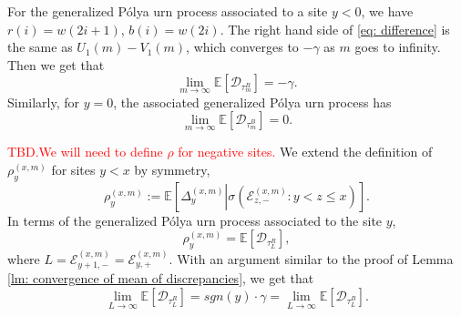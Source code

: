 \documentclass[twoside,12pt,a4paper]{article}
\numberwithin{equation}{section}
\newcommand\TBD{\textcolor{red}{TBD.}}
\begin{document}
		For the generalized P\'{o}lya urn process associated to a site $y<0$, we have $r(i) = w(2i+1)$, $b(i) =w(2i)$. The right hand side of \eqref{eq: difference} is the same as $U_1(m)-V_1(m)$, which converges to $-\gamma$ as $m$ goes to infinity. Then we get that  $$\lim_{m\to\infty}\mathbb{E}\left[ \mathcal{D}_{\tau^B_m} \right] = -\gamma.$$
		Similarly, for $y=0$, the associated generalized P\'{o}lya urn process has 
		$$\lim_{m\to\infty}\mathbb{E}\left[ \mathcal{D}_{\tau^B_m} \right] = 0.$$
		
		\TBD \textcolor{red}{We will need to define $\rho$ for negative sites.} We extend the definition of $\rho^{(x,m)}_y$ for sites $y< x$ by symmetry, 
		\[
			\rho^{(x,m)}_y := \mathbb{E}\left[  \Delta^{(x,m)}_y   \left\vert  \sigma\left( \mathcal{E}^{(x,m)}_{z, -}:  y<z\leq  x  \right. \right) \right].   
		\] 
		In terms of the generalized P\'{o}lya urn process associated to the site $y$,
		\begin{equation} \label{eq: extended definition}
			\rho^{(x,m)}_y = \mathbb{E}\left[\mathcal{D}_{\tau_L^R}\right], 
		\end{equation} where $L = \mathcal{E}^{(x,m)}_{y+1,-} = \mathcal{E}^{(x,m)}_{y,+}.$ With an argument similar to the proof of Lemma \ref{lm: convergence of mean of discrepancies}, we get that 
		\begin{equation}\label{eq: mean of discrepancies for left sites}
			\lim_{L\to \infty} \mathbb{E}\left[\mathcal{D}_{\tau_L^R}\right] =  sgn(y) \cdot \gamma = \lim_{L\to \infty} \mathbb{E}\left[\mathcal{D}_{\tau_L^B}\right].
		\end{equation}
		
\end{document}
